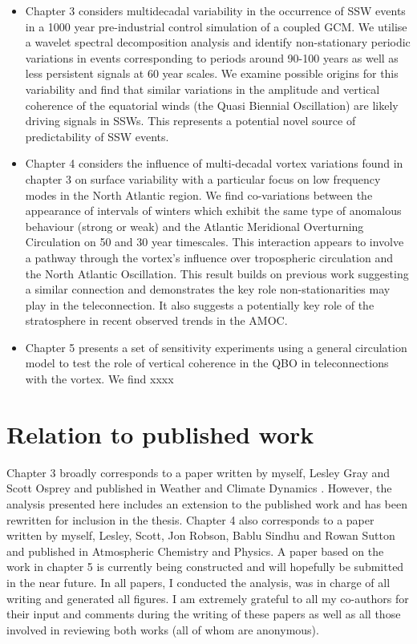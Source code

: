 \begin{itemize}
    \item Chapter 3 considers multidecadal variability in the occurrence of SSW events in a 1000 year pre-industrial control simulation of a coupled GCM. We utilise a wavelet spectral decomposition analysis and identify non-stationary periodic variations in events corresponding to periods around 90-100 years as well as less persistent signals at 60 year scales. We examine possible origins for this variability and find that similar variations in the amplitude and vertical coherence of the equatorial winds (the Quasi Biennial Oscillation) are likely driving signals in SSWs. This represents a potential novel source of predictability of SSW events.
    
    \item Chapter 4 considers the influence of multi-decadal vortex variations found in chapter 3 on surface variability with a particular focus on low frequency modes in the North Atlantic region. We find co-variations between the appearance of intervals of winters which exhibit the same type of anomalous behaviour (strong or weak) and the Atlantic Meridional Overturning Circulation on 50 and 30 year timescales. This interaction appears to involve a pathway through the vortex's influence over tropospheric circulation and the North Atlantic Oscillation. This result builds on previous work suggesting a similar connection and demonstrates the key role non-stationarities may play in the teleconnection. It also suggests a potentially key role of the stratosphere in recent observed trends in the AMOC. 
    
    \item Chapter 5 presents a set of sensitivity experiments using a general circulation model to test the role of vertical coherence in the QBO in teleconnections with the vortex. We find xxxx 
\end{itemize}

\section{Relation to published work}

Chapter 3 broadly corresponds to a paper written by myself, Lesley Gray and Scott Osprey and published in Weather and Climate Dynamics \citep{dimdore-milesOrigins2020}. However, the analysis presented here includes an extension to the published work and has been rewritten for inclusion in the thesis. Chapter 4 also corresponds to a paper written by myself, Lesley, Scott, Jon Robson, Bablu Sindhu and Rowan Sutton and published in Atmospheric Chemistry and Physics. A paper based on the work in chapter 5 is currently being constructed and will hopefully be submitted in the near future. 
In all papers, I conducted the analysis, was in charge of all writing and generated all figures. I am extremely grateful to all my co-authors for their input and comments during the writing of these papers as well as all those involved in reviewing both works (all of whom are anonymous).  

